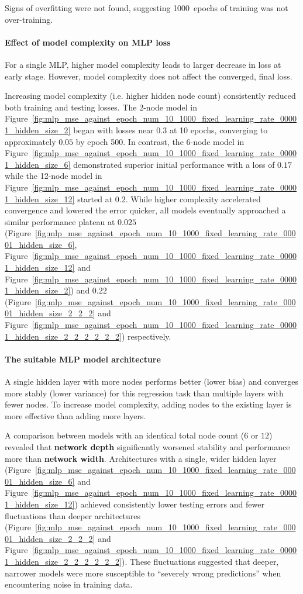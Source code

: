 Signs of overfitting were not found, suggesting 1000~epochs of training was not over-training. 

\paragraph{Effect of model complexity on MLP loss}
For a single MLP, higher model complexity leads to larger decrease in loss at early stage. However, model complexity does not affect the converged, final loss. 

Increasing model complexity (i.e. higher hidden node count) consistently reduced both training and testing losses. The 2-node model in Figure~\ref{fig:mlp_mse_against_epoch_num_10_1000_fixed_learning_rate_00001_hidden_size_2} began with losses near $0.3$ at 10 epochs, converging to approximately $0.05$ by epoch 500. In contrast, the 6-node model in Figure~\ref{fig:mlp_mse_against_epoch_num_10_1000_fixed_learning_rate_00001_hidden_size_6} demonstrated superior initial performance with a loss of $0.17$ while the 12-node model in Figure~\ref{fig:mlp_mse_against_epoch_num_10_1000_fixed_learning_rate_00001_hidden_size_12} started at $0.2$. While higher complexity accelerated convergence and lowered the error quicker, all models eventually approached a similar performance plateau at $0.025$ (Figure~\ref{fig:mlp_mse_against_epoch_num_10_1000_fixed_learning_rate_00001_hidden_size_6}, Figure~\ref{fig:mlp_mse_against_epoch_num_10_1000_fixed_learning_rate_00001_hidden_size_12} and Figure~\ref{fig:mlp_mse_against_epoch_num_10_1000_fixed_learning_rate_00001_hidden_size_2}) and $0.22$ (Figure~\ref{fig:mlp_mse_against_epoch_num_10_1000_fixed_learning_rate_00001_hidden_size_2_2_2} and Figure~\ref{fig:mlp_mse_against_epoch_num_10_1000_fixed_learning_rate_00001_hidden_size_2_2_2_2_2_2}) respectively. 

\paragraph{The suitable MLP model architecture}
A single hidden layer with more nodes performs better (lower bias) and converges more stably (lower variance) for this regression task than multiple layers with fewer nodes. To increase model complexity, adding nodes to the existing layer is more effective than adding more layers. 

A comparison between models with an identical total node count ($6$ or $12$) revealed that \textbf{network depth} significantly worsened stability and performance more than \textbf{network width}. Architectures with a single, wider hidden layer (Figure~\ref{fig:mlp_mse_against_epoch_num_10_1000_fixed_learning_rate_00001_hidden_size_6} and Figure~\ref{fig:mlp_mse_against_epoch_num_10_1000_fixed_learning_rate_00001_hidden_size_12}) achieved consistently lower testing errors and fewer fluctuations than deeper architectures (Figure~\ref{fig:mlp_mse_against_epoch_num_10_1000_fixed_learning_rate_00001_hidden_size_2_2_2} and Figure~\ref{fig:mlp_mse_against_epoch_num_10_1000_fixed_learning_rate_00001_hidden_size_2_2_2_2_2_2}). These fluctuations suggested that deeper, narrower models were more susceptible to ``severely wrong predictions'' when encountering noise in training data. 

